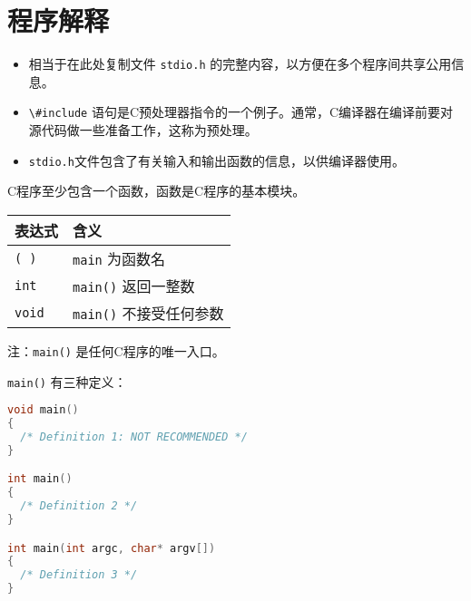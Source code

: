 \section{程序解释}
\begin{frame}


  \begin{itemize}
  \item
    相当于在此处复制文件 \lstinline|stdio.h| 的完整内容，以方便在多个程序间共享公用信息。\\[0.1in]
  \item
    \lstinline|\#include| 语句是C预处理器指令的一个例子。通常，C编译器在编译前要对源代码做一些准备工作，这称为预处理。
    \\[0.1in]
  \item
    \lstinline|stdio.h|文件包含了有关输入和输出函数的信息，以供编译器使用。
  \end{itemize}
\end{frame}

\begin{frame}
  
  C程序至少包含一个函数，函数是C程序的基本模块。\\[0.1in]
  \begin{table}
    \centering
    \begin{tabular}{ll}
      表达式 & 含义 \\ \hline
      \lstinline|( )| & \lstinline|main| 为函数名\\[0.1in]
      \lstinline|int| & \lstinline|main()| 返回一整数\\[0.1in]
      \lstinline|void| & \lstinline|main()| 不接受任何参数 \\ \hline
    \end{tabular}
  \end{table}
  
  注：\lstinline|main()| 是任何C程序的唯一入口。
\end{frame}

\begin{frame}[fragile]
  \lstinline|main()| 有三种定义：
  \begin{lstlisting}[language=c,frame=single]
void main()
{
  /* Definition 1: NOT RECOMMENDED */
}

int main()
{
  /* Definition 2 */
}

int main(int argc, char* argv[])
{
  /* Definition 3 */
}
  \end{lstlisting}
\end{frame}


